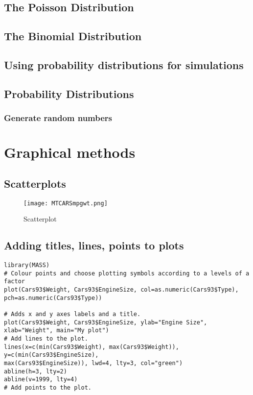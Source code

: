 \documentclass[a4paper,12pt]{article}
\begin{document}
\begin{itemize}
\begin{itemize}
\section{The Poisson Distribution}
\section{The Binomial Distribution}
\section{Using probability distributions for simulations}
\section{Probability Distributions}
\subsection{Generate random numbers }

\newpage
\chapter{Graphical methods}

\section{Scatterplots}
\begin{figure}
  \texttt{[image: MTCARSmpgwt.png]}\\
  \caption{Scatterplot}\label{mpgwt}
\end{figure}


\section{Adding titles, lines, points to plots}


\footnotesize \begin{verbatim}
library(MASS)
# Colour points and choose plotting symbols according to a levels of a factor
plot(Cars93$Weight, Cars93$EngineSize, col=as.numeric(Cars93$Type),
pch=as.numeric(Cars93$Type))

# Adds x and y axes labels and a title.
plot(Cars93$Weight, Cars93$EngineSize, ylab="Engine Size",
xlab="Weight", main="My plot")
# Add lines to the plot.
lines(x=c(min(Cars93$Weight), max(Cars93$Weight)), y=c(min(Cars93$EngineSize),
max(Cars93$EngineSize)), lwd=4, lty=3, col="green")
abline(h=3, lty=2)
abline(v=1999, lty=4)
# Add points to the plot.
\end{verbatim}\normalsize


\end{itemize}
\end{itemize}
\end{document}
